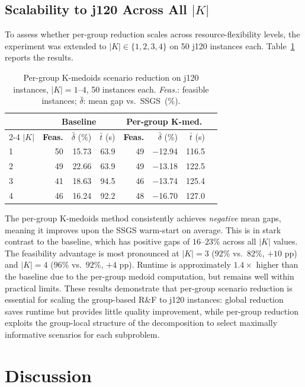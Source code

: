 \subsection{Scalability to j120 Across All $|K|$}
To assess whether per-group reduction scales across
resource-flexibility levels, the experiment was extended to
$|K| \in \{1, 2, 3, 4\}$ on 50 j120 instances each.
Table~\ref{tab:scen_red_j120_allk} reports the results.
\begin{table}[htbp]
\centering
\renewcommand{\arraystretch}{1.35}
\caption{Per-group K-medoids scenario reduction on j120 instances,
         $|K|=1$--$4$, 50 instances each.
         \emph{Feas.}: feasible instances;
         $\bar{\delta}$: mean gap vs.\ SSGS~(\%).}
\label{tab:scen_red_j120_allk}
\begin{tabular}{l r r r r r r r}
\hline
 & \multicolumn{3}{c}{\textbf{Baseline}} &
   \multicolumn{3}{c}{\textbf{Per-group K-med.}} \\
\cline{2-4} \cline{5-7}
$|K|$ &
\textbf{Feas.} & $\bar{\delta}$ (\%) & $\bar{t}$ (s) &
\textbf{Feas.} & $\bar{\delta}$ (\%) & $\bar{t}$ (s) \\
\hline
1 & 50 & 15.73 &  63.9 & 49 & $-$12.94 & 116.5 \\
2 & 49 & 22.66 &  63.9 & 49 & $-$13.18 & 122.5 \\
3 & 41 & 18.63 &  94.5 & 46 & $-$13.74 & 125.4 \\
4 & 46 & 16.24 &  92.2 & 48 & $-$16.70 & 127.0 \\
\hline
\end{tabular}
\end{table}
The per-group K-medoids method consistently achieves
\emph{negative} mean gaps, meaning it improves upon the SSGS
warm-start on average. This is in stark contrast to the
baseline, which has positive gaps of $16$--$23\%$ across all
$|K|$ values. The feasibility advantage is most pronounced at
$|K|=3$ ($92\%$ vs.\ $82\%$, $+10$ pp) and $|K|=4$ ($96\%$
vs.\ $92\%$, $+4$ pp). Runtime is approximately $1.4\times$
higher than the baseline due to the per-group medoid computation,
but remains well within practical limits.
These results demonstrate that per-group scenario reduction is
essential for scaling the group-based R\&F to j120 instances:
global reduction saves runtime but provides little quality
improvement, while per-group reduction exploits the
group-local structure of the decomposition to select maximally
informative scenarios for each subproblem.
\section{Discussion}
\label{sec:discussion}
